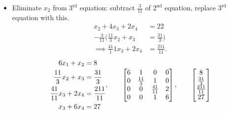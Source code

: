 \documentclass[]{article}
\begin{document}
\begin{example}
\begin{itemize}
		\item Eliminate $x_2$ from $3^\text{rd}$ equation: subtract $\frac3{11}$ of $2^\text{nd}$ equation, replace $3^\text{rd}$ equation with this.
			\begin{align*}
				x_2 + 4x_3 + 2x_4 &= 22 \\
				-\frac3{11}\bigg(\frac{11}3x_2 + x_3 &= \frac{31}3\bigg) \\
				\implies \frac{41}11 x_3 + 2x_4 &= \frac{211}{11}.
			\end{align*}
			$$\begin{aligned}
				6x_1 + x_2 &= 8 \\
				\frac{11}3 x_2 + x_3 &= \frac{31}3 \\
				\frac{41}{11}x_3 + 2x_4 &= \frac{211}{11} \\
				x_3+6x_4 &= 27
			\end{aligned}, \qquad
			\begin{bmatrix}6&1&0&0\\0&\frac{11}3&1&0\\0&0&\frac{41}{11}&2\\0&0&1&6\end{bmatrix}, \qquad \begin{bmatrix}8\\\frac{31}3\\\frac{211}{11}\\27\end{bmatrix} $$


\end{itemize}
\end{example}
\end{document}
